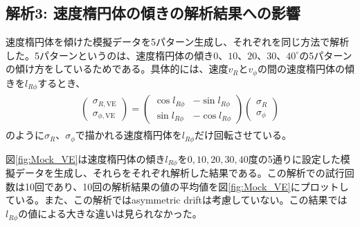 \subsection{解析3: 速度楕円体の傾きの解析結果への影響 \label{解析3}}
速度楕円体を傾けた模擬データを5パターン生成し、それぞれを同じ方法で解析した。5パターンというのは、速度楕円体の傾き$0、10、20、30、40^{\circ}$の5パターンの傾け方をしているためである。具体的には、速度$v_R$と$v_{\phi}$の間の速度楕円体の傾きを$l_{R\phi}$するとき、
\begin{align}
\begin{aligned}
	\left(
	\begin{array}{c}
	 	\sigma_{R,\mathrm{VE}}\\
	 	\sigma_{\phi,\mathrm{VE}}
	\end{array}
	\right)
	=
	\left(
	\begin{array}{cc}
	 	\cos{l_{R\phi}} & -\sin{l_{R\phi}}\\
	 	\sin{l_{R\phi}} & -\cos{l_{R\phi}}
	\end{array}
	\right)
	\left(
	\begin{array}{c}
	 	\sigma_R\\
	 	\sigma_{\phi}
	\end{array}
	\right)
\end{aligned}
\end{align}
のように$\sigma_R、\sigma_{\phi}$で描かれる速度楕円体を$l_{R\phi}$だけ回転させている。

図\ref{fig:Mock_VE}は速度楕円体の傾き$l_{R\phi}$を$0,10,20,30,40$度の5通りに設定した模擬データを生成し、それらをそれぞれ解析した結果である。この解析での試行回数は10回であり、10回の解析結果の値の平均値を図\ref{fig:Mock_VE}にプロットしている。また、この解析ではasymmetric driftは考慮していない。この結果では$l_{R\phi}$の値による大きな違いは見られなかった。

